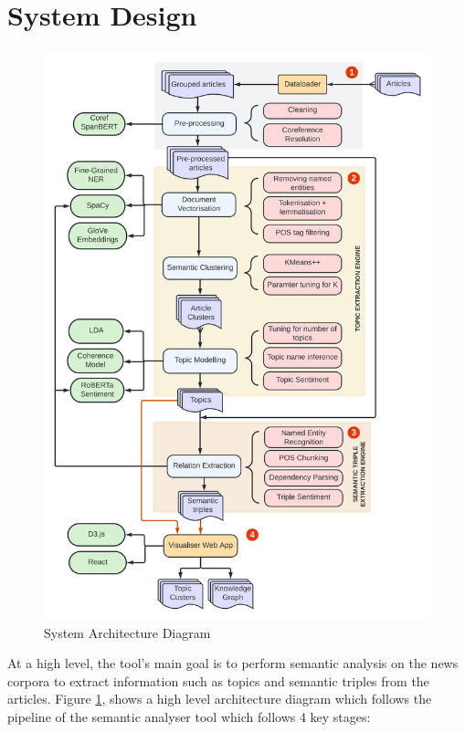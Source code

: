\section{System Design}

\begin{figure}[H]
\centering
\includegraphics[width=0.7\linewidth]{images/system_arch.png}
\caption{System Architecture Diagram}
\label{fig:sys_arch}
\end{figure}
At a high level, the tool's main goal is to perform semantic analysis on the news corpora to extract information such as topics and semantic triples from the articles. Figure \ref{fig:sys_arch}, shows a high level architecture diagram which follows the pipeline of the semantic analyser tool which follows 4 key stages: 


